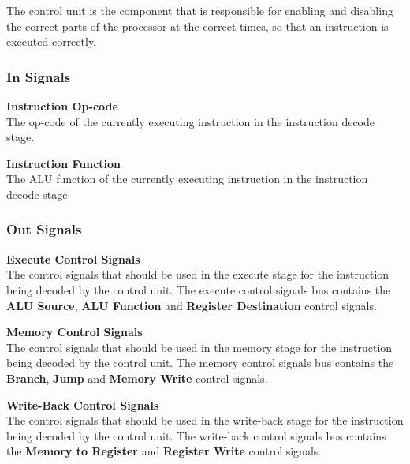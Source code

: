 The control unit is the component that is responsible for enabling and disabling the correct parts of the processor at the correct times, so that an instruction is executed correctly.

\subsubsection{In Signals}

\begin{description}
\item{\textbf{Instruction Op-code}} \\
    The op-code of the currently executing instruction in the instruction decode stage.

\item{\textbf{Instruction Function}} \\
    The ALU function of the currently executing instruction in the instruction decode stage. 
\end{description}

\subsubsection{Out Signals}

\begin{description}
\item{\textbf{Execute Control Signals}} \\
    The control signals that should be used in the execute stage for the instruction being decoded by the control unit.
    The execute control signals bus contains the \textbf{ALU Source}, \textbf{ALU Function} and \textbf{Register Destination} control signals.

\item{\textbf{Memory Control Signals}} \\
    The control signals that should be used in the memory stage for the instruction being decoded by the control unit.
    The memory control signals bus contains the \textbf{Branch}, \textbf{Jump} and \textbf{Memory Write} control signals.

\item{\textbf{Write-Back Control Signals}} \\
    The control signals that should be used in the write-back stage for the instruction being decoded by the control unit.
The write-back control signals bus contains the \textbf{Memory to Register} and \textbf{Register Write} control signals.
\end{description}

